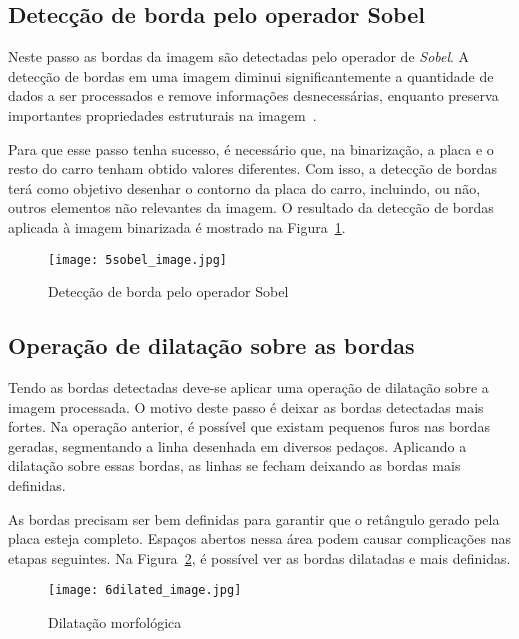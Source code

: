 \subsection{Detecção de borda pelo operador Sobel}
\label{sec:detec_bordas}

Neste passo as bordas da imagem são detectadas pelo operador de \emph{Sobel}. A
detecção de bordas em uma imagem diminui significantemente a quantidade de dados
a ser processados e remove informações desnecessárias, enquanto preserva
importantes propriedades estruturais na imagem~\cite{ha2016license}.

Para que esse passo tenha sucesso, é necessário que, na binarização, a placa e o
resto do carro tenham obtido valores diferentes. Com isso, a detecção de bordas
terá como objetivo desenhar o contorno da placa do carro, incluindo, ou não,
outros elementos não relevantes da imagem. O resultado da detecção de bordas
aplicada à imagem binarizada é mostrado na
Figura~\ref{fig:ext_edge_detection_sobel}.

\begin{figure}[H]
	\centering
	\texttt{[image: 5sobel\_image.jpg]}
	\caption{Detecção de borda pelo operador Sobel}
	\label{fig:ext_edge_detection_sobel}
\end{figure}

\subsection{Operação de dilatação sobre as bordas}

Tendo as bordas detectadas deve-se aplicar uma operação de dilatação sobre a
imagem processada. O motivo deste passo é deixar as bordas detectadas mais
fortes. Na operação anterior, é possível que existam pequenos furos nas bordas
geradas, segmentando a linha desenhada em diversos pedaços. Aplicando a
dilatação sobre essas bordas, as linhas se fecham deixando as bordas mais
definidas.

As bordas precisam ser bem definidas para garantir que o retângulo gerado pela
placa esteja completo. Espaços abertos nessa área podem causar complicações nas
etapas seguintes. Na Figura~\ref{fig:ext_morphological_dilation}, é possível ver
as bordas dilatadas e mais definidas.

\begin{figure}[H]
	\centering
	\texttt{[image: 6dilated\_image.jpg]}
	\caption{Dilatação morfológica}
	\label{fig:ext_morphological_dilation}
\end{figure}

